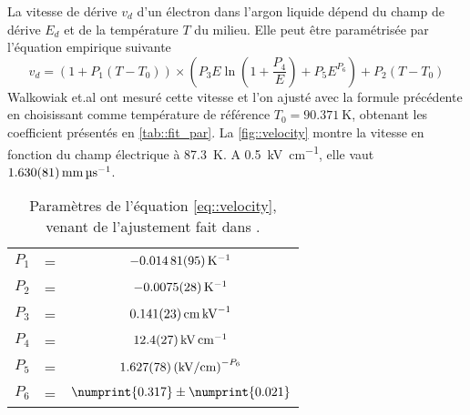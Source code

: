         La vitesse de dérive $v_d$ d'un électron dans l'argon liquide dépend du champ de dérive $E_d$ et de la température $T$ du milieu. Elle peut être paramétrisée par l'équation empirique suivante\cite{Gonidec1996}
        \begin{equation}\label{eq::velocity}
          v_d = \left(1+P_1(T-T_0)\right)\times\left(P_3E\ln\left(1+\frac{P_4}{E}\right)+P_5E^{P_6}\right) + P_2(T-T_0)
        \end{equation}
        Walkowiak et.al\cite{Walkowiak2000} ont mesuré cette vitesse et l'on ajusté avec la formule précédente en choisissant comme température de référence $T_0=\SI{90.371}{\kelvin}$, obtenant les coefficient présentés en \autoref{tab::fit_par}. La \autoref{fig::velocity} montre la vitesse en fonction du champ électrique à \SI{87.3}{\kelvin}. A \SI{0.5}{\kilo\volt\per\centi\meter}, elle vaut $\SI{1.63\pm0.081}{\milli\meter\per\micro\second}$.
        \begin{table}[htpb]
          \centering
          \begin{tabular}{ccc}
          $P_1$ & = & $\SI{-0.01481\pm0.00095}{\per\kelvin}$ \\
          $P_2$ & = & $\SI{-0.0075\pm0.0028}{\per\kelvin}$ \\
          $P_3$ & = & $\SI{0.141\pm0.023}{\centi\meter\per\kilo\volt}$ \\
          $P_4$ & = & $\SI{12.4\pm2.7}{\kilo\volt\per\centi\meter}$ \\
          $P_5$ & = & $\SI{1.627\pm0.078}{(\kilo\volt\per\centi\meter)^{-P_6}}$ \\
          $P_6$ & = & $\numprint{0.317}\pm\numprint{0.021}$ \\
          \end{tabular}
          \caption{\label{tab::fit_par}Paramètres de l'équation \eqref{eq::velocity}, venant de l'ajustement fait dans \cite{Walkowiak2000}.}
        \end{table}
%        
